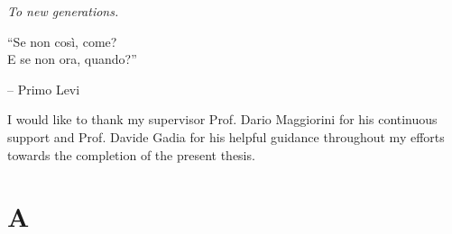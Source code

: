 \documentclass[english]{report}
\begin{document}
\renewcommand\contentsname{Index}
\frontespizio
\beforepreface

{
\raggedleft \large \sl To new generations.\\
	
	\vspace{2cm}
	
	``Se non così, come?\\E se non ora, quando?''
	
	\bigskip
	
	\--- Primo Levi\\
}



I would like to thank my supervisor Prof. Dario Maggiorini for his continuous support and Prof. Davide Gadia for his helpful guidance throughout my efforts towards the completion of the present thesis.

%
%
\afterpreface

















% 
% 

\appendix

\chapter{A}

%
%


\end{document}
